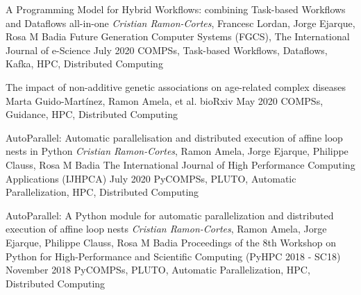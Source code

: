%
%
%

\newpage


\begin{publications}
    
    \publication
        {A Programming Model for Hybrid Workflows: combining Task-based Workflows and Dataflows all-in-one}
        {\textit{Cristian Ramon-Cortes}, Francesc Lordan, Jorge Ejarque, Rosa M Badia}
        {Future Generation Computer Systems (FGCS), The International Journal of e-Science}
        {July 2020}
        {COMPSs, Task-based Workflows, Dataflows, Kafka, HPC, Distributed Computing}
        {}

    \publication
        {The impact of non-additive genetic associations on age-related complex diseases}
        {Marta Guido-Martínez, Ramon Amela, et al.}
        {bioRxiv}
        {May 2020}
        {COMPSs, Guidance, HPC, Distributed Computing}
        {}

    \publication
        {AutoParallel: Automatic parallelisation and distributed execution of affine loop nests in Python}
        {\textit{Cristian Ramon-Cortes}, Ramon Amela, Jorge Ejarque, Philippe Clauss, Rosa M Badia}
        {The International Journal of High Performance Computing Applications (IJHPCA)}
        {July 2020}
        {PyCOMPSs, PLUTO, Automatic Parallelization, HPC, Distributed Computing}
        {}
    
    \publication
        {AutoParallel: A Python module for automatic parallelization and distributed execution of affine loop nests}
        {\textit{Cristian Ramon-Cortes}, Ramon Amela, Jorge Ejarque, Philippe Clauss, Rosa M Badia}
        {Proceedings of the 8th Workshop on Python for High-Performance and Scientific Computing (PyHPC 2018 - SC18)}
        {November 2018}
        {PyCOMPSs, PLUTO, Automatic Parallelization, HPC, Distributed Computing}
        {}
        

\end{publications}
